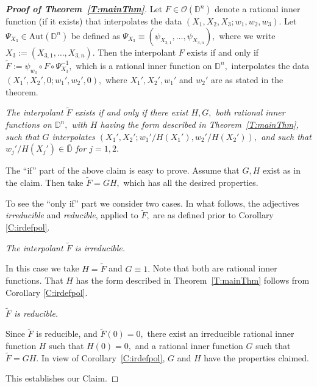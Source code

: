 \documentclass[11pt, reqno]{amsart}
\numberwithin{equation}{section}
\theoremstyle{definition}
\theoremstyle{remark}
\theoremstyle{plain}
\begin{document}
\begin{proof}[{\bf Proof of Theorem~\ref{T:mainThm}}] Let $F\in{\mathcal{O}}({\mathbb{D}}^n)$ denote a rational inner function
(if it exists) that interpolates the data $(X_1,X_2,X_3;w_1,w_2,w_3).$ Let $\Psi_{X_3}
\in\text{Aut}({\mathbb{D}}^n)$ be defined as $\Psi_{X_3}\equiv(\psi_{X_{3,1}},\ldots,\psi_{X_{3,n}}),$
where we write $X_3:=(X_{3,1},\ldots,X_{3,n}).$ Then the interpolant $F$ exists if and only if
$\widetilde{F}:=\psi_{w_3}\circ F\circ{\Psi_{X_3}^{-1}},$ which is a rational inner function on ${\mathbb{D}}^n,$
interpolates the data $(X_1',X_2',0;w_1',w_2',0),$ where $X_1',X_2',w_1'$ and $w_2'$ are as stated in the theorem.
\smallskip

 {\em The interpolant $\widetilde{F}$ exists if and only if there exist $H,G,$
both rational inner functions on ${\mathbb{D}}^n,$ with $H$ having the form described in Theorem~\ref{T:mainThm}, 
such that $G$ interpolates $(X_1',X_2';{w_1'}/{H(X_1')},{w_2'}/{H(X_2')}),$ and such that 
${w_j'}/{H(X_j')}\in\overline{\mathbb{D}}$ for $j=1,2.$}

\noindent The ``if'' part of the above claim is easy to prove. Assume that $G,H$ exist as in the claim. Then take
$\widetilde{F}=GH,$ which has all the desired properties.
\smallskip

To see the ``only if'' part we consider two cases.
In what follows, the adjectives {\em irreducible} and {\em reducible},
applied to $\widetilde{F},$ are as defined prior to Corollary \ref{C:irdefpol}.
\smallskip

 {\em The interpolant $\widetilde{F}$ is irreducible.}
 
\noindent In this case we take $H=\widetilde{F}$ and $G\equiv 1.$
Note that both are rational inner functions. That $H$ has the form described in Theorem~\ref{T:mainThm}
follows from Corollary \ref{C:irdefpol}.
\smallskip

 {\em $\widetilde{F}$ is reducible.}
 
\noindent Since $\widetilde{F}$ is reducible, and $\widetilde{F}(0)=0,$ there exist an irreducible rational inner function
$H$ such that $H(0)=0,$ and a rational inner function $G$ such that $\widetilde{F}=GH.$ In view of
Corollary~\ref{C:irdefpol}, $G$ and $H$ have the properties claimed. 
\smallskip

This establishes our Claim.
\smallskip


\end{proof}
\end{document}
